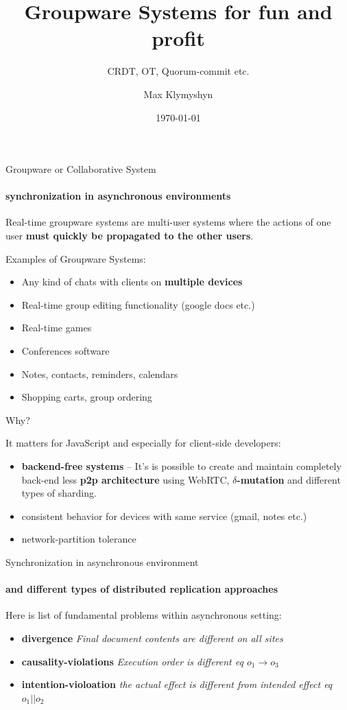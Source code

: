 \documentclass{beamer}
\title{Groupware Systems for fun and profit}
\subtitle{CRDT, OT, Quorum-commit etc.} %
\author{Max Klymyshyn}
\date{\today}
\begin{document}
\begin{frame}
\titlepage
\end{frame}



\begin{frame}{Groupware or Collaborative System}
\framesubtitle{synchronization in asynchronous environments}


\begin{block}{}
Real-time groupware systems are multi-user systems
where the actions of one user 
\textbf{must quickly be propagated to the other users}.
\end{block}

\vspace{0.5cm}
Examples of Groupware Systems:


\begin{itemize}
\item Any kind of chats with clients on \textbf{multiple devices}
\item Real-time group editing functionality (google docs etc.)
\item Real-time games
\item Conferences software
\item Notes, contacts, reminders, calendars
\item Shopping carts, group ordering
\end{itemize}

\end{frame}


\begin{frame}{Why?}

It matters for JavaScript and especially for client-side developers:
\vspace{1cm}
\begin{itemize}
	\item \textbf{backend-free systems} – It's is possible to create and maintain completely back-end less \textbf{p2p architecture} using WebRTC, \textbf{$\delta$-mutation} and different types of sharding.
	\item consistent behavior for devices with same service (gmail, notes etc.)
	\item network-partition tolerance
\end{itemize}
\end{frame}


\begin{frame}{Synchronization in asynchronous environment}
\framesubtitle{and different types of distributed replication approaches}

Here is list of fundamental problems within asynchronous setting:
\begin{itemize}

\item \textbf{divergence} \small{\textit{Final document contents are different on all sites}}
\item \textbf{causality-violations} \small{\textit{Execution order is different eq $o_1 \rightarrow o_3$}}
\item \textbf{intention-violoation} \small{\textit{the actual effect is different from intended effect eq $o_1 || o_2$}}
\end{itemize}
\end{frame}
\end{document}
